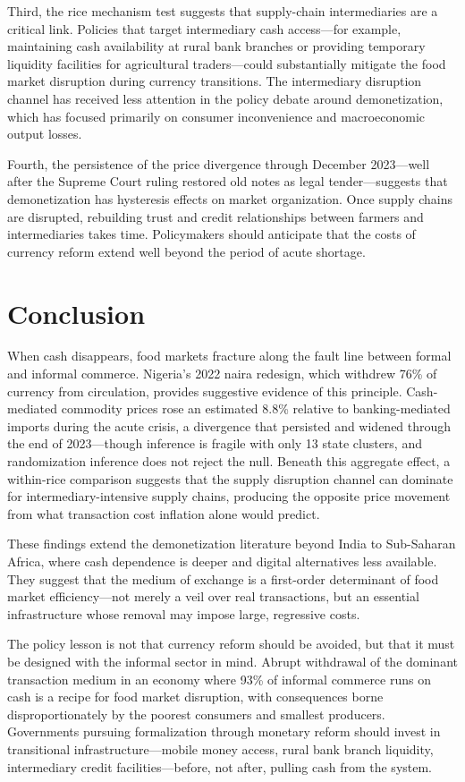 \documentclass[12pt]{article}
\begin{document}
Third, the rice mechanism test suggests that supply-chain intermediaries are a critical link. Policies that target intermediary cash access---for example, maintaining cash availability at rural bank branches or providing temporary liquidity facilities for agricultural traders---could substantially mitigate the food market disruption during currency transitions. The intermediary disruption channel has received less attention in the policy debate around demonetization, which has focused primarily on consumer inconvenience and macroeconomic output losses.

Fourth, the persistence of the price divergence through December 2023---well after the Supreme Court ruling restored old notes as legal tender---suggests that demonetization has hysteresis effects on market organization. Once supply chains are disrupted, rebuilding trust and credit relationships between farmers and intermediaries takes time. Policymakers should anticipate that the costs of currency reform extend well beyond the period of acute shortage.


\section{Conclusion}
\label{sec:conclusion}

When cash disappears, food markets fracture along the fault line between formal and informal commerce. Nigeria's 2022 naira redesign, which withdrew 76\% of currency from circulation, provides suggestive evidence of this principle. Cash-mediated commodity prices rose an estimated 8.8\% relative to banking-mediated imports during the acute crisis, a divergence that persisted and widened through the end of 2023---though inference is fragile with only 13 state clusters, and randomization inference does not reject the null. Beneath this aggregate effect, a within-rice comparison suggests that the supply disruption channel can dominate for intermediary-intensive supply chains, producing the opposite price movement from what transaction cost inflation alone would predict.

These findings extend the demonetization literature beyond India to Sub-Saharan Africa, where cash dependence is deeper and digital alternatives less available. They suggest that the medium of exchange is a first-order determinant of food market efficiency---not merely a veil over real transactions, but an essential infrastructure whose removal may impose large, regressive costs.

The policy lesson is not that currency reform should be avoided, but that it must be designed with the informal sector in mind. Abrupt withdrawal of the dominant transaction medium in an economy where 93\% of informal commerce runs on cash is a recipe for food market disruption, with consequences borne disproportionately by the poorest consumers and smallest producers. Governments pursuing formalization through monetary reform should invest in transitional infrastructure---mobile money access, rural bank branch liquidity, intermediary credit facilities---before, not after, pulling cash from the system.
\end{document}
